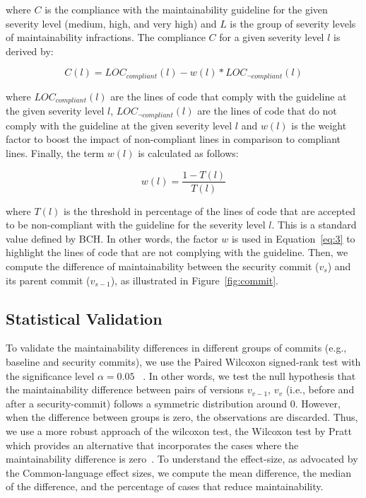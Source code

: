 \documentclass[10pt,conference]{IEEEtran}
\begin{document}
\noindent
where $C$ is the compliance with the maintainability guideline for the given
severity level (medium, high, and very high) and $L$ is the group of severity
levels of maintainability infractions. The compliance $C$ for a given severity
level $l$ is derived by:

\begin{equation}\label{eq:3}
    C(l) = LOC_{compliant}(l) - w(l) * LOC_{\neg compliant}(l)
\end{equation}

\noindent
where $LOC_{compliant}(l)$ are the lines of code that comply with the guideline
at the given severity level $l$, $LOC_{\neg compliant}(l)$ are the lines of code
that do not comply with the guideline at the given severity level $l$ and $w(l)$
is the weight factor to boost the impact of non-compliant lines in comparison to
compliant lines. Finally, the term $w(l)$ is calculated as follows:

\begin{equation}
    w(l) = \frac{1 - T(l)}{T(l)}
\end{equation}

\noindent
where $T(l)$ is the threshold in percentage of the lines of code that are
accepted to be non-compliant with the guideline for the severity level $l$. This
is a standard value defined by BCH. In other words, the factor $w$ is used in
Equation~\ref{eq:3} to highlight the lines of code that are not complying with
the guideline. Then, we compute the difference of maintainability between the
security commit ($v_{s}$) and its parent commit ($v_{s-1}$), as illustrated in
Figure~\ref{fig:commit}.

\subsection{Statistical Validation}\label{sec:statsval}
%
To validate the maintainability differences in different groups of commits
(e.g., baseline and security commits), we use the Paired Wilcoxon signed-rank
test with the significance level $\alpha = 0.05$~\cite{10.2307/3001968} . In
other words, we test the null hypothesis that the maintainability difference
between pairs of versions $v_{v-1}$, $v_v$ (i.e., before and after a
security-commit) follows a symmetric distribution around $0$. However, when the
difference between groups is zero, the observations are discarded. Thus, we use
a more robust approach of the wilcoxon test, the Wilcoxon test by Pratt which
provides an alternative that incorporates the cases where the maintainability
difference is zero~\cite{10.2307/2282543}. To understand the effect-size, as
advocated by the Common-language effect sizes\cite{graw:1992}, we compute the
mean difference, the median of the difference, and the percentage of cases that
reduce maintainability.
%
\end{document}
